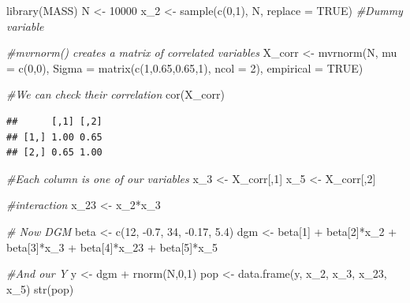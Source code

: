 \documentclass[
]{book}
\newenvironment{Shaded}{\begin{snugshade}}{\end{snugshade}}
\newcommand{\AttributeTok}[1]{\textcolor[rgb]{0.77,0.63,0.00}{#1}}
\newcommand{\CommentTok}[1]{\textcolor[rgb]{0.56,0.35,0.01}{\textit{#1}}}
\newcommand{\ConstantTok}[1]{\textcolor[rgb]{0.00,0.00,0.00}{#1}}
\newcommand{\DecValTok}[1]{\textcolor[rgb]{0.00,0.00,0.81}{#1}}
\newcommand{\FloatTok}[1]{\textcolor[rgb]{0.00,0.00,0.81}{#1}}
\newcommand{\FunctionTok}[1]{\textcolor[rgb]{0.00,0.00,0.00}{#1}}
\newcommand{\NormalTok}[1]{#1}
\newcommand{\OtherTok}[1]{\textcolor[rgb]{0.56,0.35,0.01}{#1}}
\newcommand{\SpecialCharTok}[1]{\textcolor[rgb]{0.00,0.00,0.00}{#1}}
\begin{document}
\begin{Shaded}
\begin{Highlighting}[]
\FunctionTok{library}\NormalTok{(MASS)}
\NormalTok{N }\OtherTok{\textless{}{-}} \DecValTok{10000}
\NormalTok{x\_2 }\OtherTok{\textless{}{-}} \FunctionTok{sample}\NormalTok{(}\FunctionTok{c}\NormalTok{(}\DecValTok{0}\NormalTok{,}\DecValTok{1}\NormalTok{), N, }\AttributeTok{replace =} \ConstantTok{TRUE}\NormalTok{) }\CommentTok{\#Dummy variable}

\CommentTok{\#mvrnorm() creates a matrix of correlated variables }
\NormalTok{X\_corr }\OtherTok{\textless{}{-}} \FunctionTok{mvrnorm}\NormalTok{(N, }\AttributeTok{mu =} \FunctionTok{c}\NormalTok{(}\DecValTok{0}\NormalTok{,}\DecValTok{0}\NormalTok{), }\AttributeTok{Sigma =} \FunctionTok{matrix}\NormalTok{(}\FunctionTok{c}\NormalTok{(}\DecValTok{1}\NormalTok{,}\FloatTok{0.65}\NormalTok{,}\FloatTok{0.65}\NormalTok{,}\DecValTok{1}\NormalTok{), }\AttributeTok{ncol =} \DecValTok{2}\NormalTok{),}
               \AttributeTok{empirical =} \ConstantTok{TRUE}\NormalTok{)}

\CommentTok{\#We can check their correlation}
\FunctionTok{cor}\NormalTok{(X\_corr)}
\end{Highlighting}
\end{Shaded}

\begin{verbatim}
##      [,1] [,2]
## [1,] 1.00 0.65
## [2,] 0.65 1.00
\end{verbatim}

\begin{Shaded}
\begin{Highlighting}[]
\CommentTok{\#Each column is one of our variables}
\NormalTok{x\_3 }\OtherTok{\textless{}{-}}\NormalTok{ X\_corr[,}\DecValTok{1}\NormalTok{]}
\NormalTok{x\_5 }\OtherTok{\textless{}{-}}\NormalTok{ X\_corr[,}\DecValTok{2}\NormalTok{]}

\CommentTok{\#interaction}
\NormalTok{x\_23 }\OtherTok{\textless{}{-}}\NormalTok{ x\_2}\SpecialCharTok{*}\NormalTok{x\_3}
  
\CommentTok{\# Now DGM}
\NormalTok{beta }\OtherTok{\textless{}{-}} \FunctionTok{c}\NormalTok{(}\DecValTok{12}\NormalTok{, }\SpecialCharTok{{-}}\FloatTok{0.7}\NormalTok{, }\DecValTok{34}\NormalTok{, }\SpecialCharTok{{-}}\FloatTok{0.17}\NormalTok{, }\FloatTok{5.4}\NormalTok{)}
\NormalTok{dgm }\OtherTok{\textless{}{-}}\NormalTok{ beta[}\DecValTok{1}\NormalTok{] }\SpecialCharTok{+}\NormalTok{ beta[}\DecValTok{2}\NormalTok{]}\SpecialCharTok{*}\NormalTok{x\_2 }\SpecialCharTok{+}\NormalTok{ beta[}\DecValTok{3}\NormalTok{]}\SpecialCharTok{*}\NormalTok{x\_3 }\SpecialCharTok{+}\NormalTok{ beta[}\DecValTok{4}\NormalTok{]}\SpecialCharTok{*}\NormalTok{x\_23 }\SpecialCharTok{+}\NormalTok{ beta[}\DecValTok{5}\NormalTok{]}\SpecialCharTok{*}\NormalTok{x\_5}

\CommentTok{\#And our Y}
\NormalTok{y }\OtherTok{\textless{}{-}}\NormalTok{ dgm }\SpecialCharTok{+} \FunctionTok{rnorm}\NormalTok{(N,}\DecValTok{0}\NormalTok{,}\DecValTok{1}\NormalTok{)}
\NormalTok{pop }\OtherTok{\textless{}{-}} \FunctionTok{data.frame}\NormalTok{(y, x\_2, x\_3, x\_23, x\_5)}
\FunctionTok{str}\NormalTok{(pop)}
\end{Highlighting}
\end{Shaded}
\end{document}
